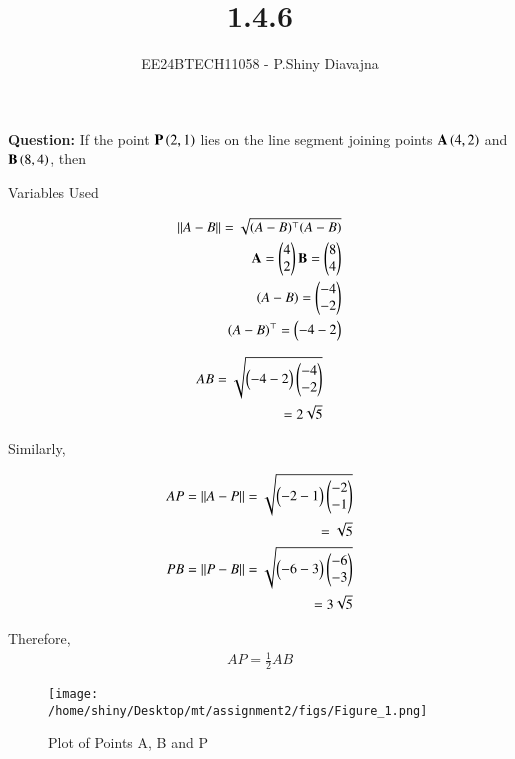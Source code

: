 \documentclass[journal]{IEEEtran}
\begin{document}

\vspace{3cm}

\title{1.4.6}
\author{EE24BTECH11058 - P.Shiny Diavajna}
{\let\newpage\relax\maketitle}

\renewcommand{\thefigure}{\theenumi}
\renewcommand{\thetable}{\theenumi}
\setlength{\intextsep}{10pt} %


\renewcommand{\thetable}{\theenumi}

\textbf{Question:} If the point $\mathbf{P}\left(2,1\right)$ lies on the line segment joining points $\mathbf{A}\left(4,2\right)$ and $\mathbf{B}\left(8,4\right)$, then \\

   \solution
   \begin{table}[h!]    
     \centering
     
     \caption{Variables Used}
     \label{tab10.5.3.9.1}
   \end{table}


   \begin{align*}
      ||A-B||=\sqrt{(A-B)^\top(A-B)}\\
      \mathbf{A}=\begin{pmatrix}4\\2\end{pmatrix}   \mathbf{B}=\begin{pmatrix}8\\4\end{pmatrix}\\
      (A-B)=\begin{pmatrix}-4\\-2\end{pmatrix}\\
      (A-B)^\top=\begin{pmatrix}-4 -2\end{pmatrix}\\
   \end{align*}

   \begin{align*}
      AB=\sqrt{\begin{pmatrix}-4 -2\end{pmatrix} \begin{pmatrix}-4\\-2\end{pmatrix}} \\=2\sqrt{5}\\
   \end{align*}
   
   Similarly,

   \begin{align*}
      AP=||A-P||=\sqrt{\begin{pmatrix}-2 -1\end{pmatrix} \begin{pmatrix}-2\\-1\end{pmatrix}}\\=\sqrt{5}\\
      PB=||P-B||=\sqrt{\begin{pmatrix}-6 -3\end{pmatrix} \begin{pmatrix}-6\\-3\end{pmatrix}}\\=3\sqrt{5}\\
   \end{align*}

 Therefore,
 \begin{align*}
     AP=\frac{1}{2}AB
 \end{align*}

  \begin{figure}[h]
    \centering
    \texttt{[image: /home/shiny/Desktop/mt/assignment2/figs/Figure\_1.png]}
    \caption{Plot of Points A, B and P}
 \end{figure}
\end{document}
